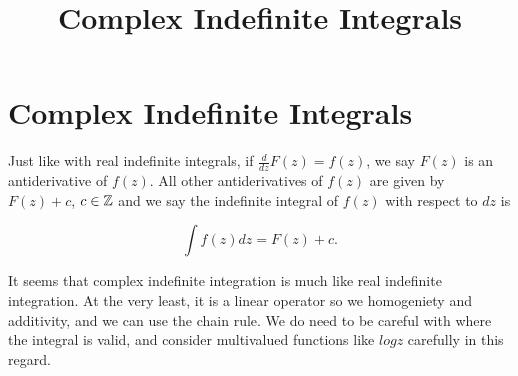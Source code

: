 \documentclass{article}
\title{Complex Indefinite Integrals}
\begin{document}
\section{Complex Indefinite Integrals}

Just like with real indefinite integrals, if $\frac{d}{dz} F(z) = f(z)$, we say $F(z)$ is an antiderivative of $f(z)$. All other antiderivatives of $f(z)$ are given by $F(z) + c$, $c \in \mathbb{Z}$ and we say the indefinite integral of $f(z)$ with respect to $dz$ is

\[ \int{f(z)}dz = F(z) + c. \]

It seems that complex indefinite integration is much like real indefinite integration. At the very least, it is a linear operator so we homogeniety and additivity, and we can use the chain rule. We do need to be careful with where the integral is valid, and consider multivalued functions like $logz$ carefully in this regard.
\end{document}
